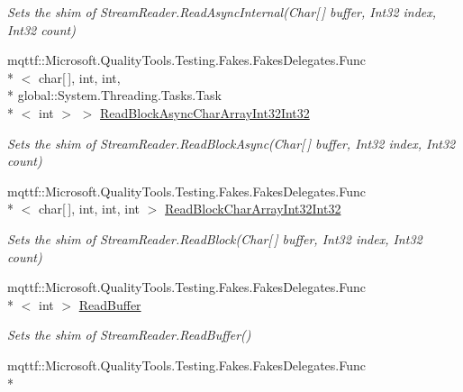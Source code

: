 \begin{DoxyCompactItemize}
\begin{DoxyCompactList}\small\item\em Sets the shim of Stream\-Reader.\-Read\-Async\-Internal(\-Char\mbox{[}$\,$\mbox{]} buffer, Int32 index, Int32 count)\end{DoxyCompactList}\item 
mqttf\-::\-Microsoft.\-Quality\-Tools.\-Testing.\-Fakes.\-Fakes\-Delegates.\-Func\\*
$<$ char\mbox{[}$\,$\mbox{]}, int, int, \\*
global\-::\-System.\-Threading.\-Tasks.\-Task\\*
$<$ int $>$ $>$ \hyperlink{class_system_1_1_i_o_1_1_fakes_1_1_shim_stream_reader_a238e61258cbe225f53c4c9f9249385ad}{Read\-Block\-Async\-Char\-Array\-Int32\-Int32}
\begin{DoxyCompactList}\small\item\em Sets the shim of Stream\-Reader.\-Read\-Block\-Async(\-Char\mbox{[}$\,$\mbox{]} buffer, Int32 index, Int32 count)\end{DoxyCompactList}\item 
mqttf\-::\-Microsoft.\-Quality\-Tools.\-Testing.\-Fakes.\-Fakes\-Delegates.\-Func\\*
$<$ char\mbox{[}$\,$\mbox{]}, int, int, int $>$ \hyperlink{class_system_1_1_i_o_1_1_fakes_1_1_shim_stream_reader_af3d6c970b696de454a6cd7bd5949cff2}{Read\-Block\-Char\-Array\-Int32\-Int32}
\begin{DoxyCompactList}\small\item\em Sets the shim of Stream\-Reader.\-Read\-Block(\-Char\mbox{[}$\,$\mbox{]} buffer, Int32 index, Int32 count)\end{DoxyCompactList}\item 
mqttf\-::\-Microsoft.\-Quality\-Tools.\-Testing.\-Fakes.\-Fakes\-Delegates.\-Func\\*
$<$ int $>$ \hyperlink{class_system_1_1_i_o_1_1_fakes_1_1_shim_stream_reader_a104dad17f6074045365ed015a79d271d}{Read\-Buffer}
\begin{DoxyCompactList}\small\item\em Sets the shim of Stream\-Reader.\-Read\-Buffer()\end{DoxyCompactList}\item 
mqttf\-::\-Microsoft.\-Quality\-Tools.\-Testing.\-Fakes.\-Fakes\-Delegates.\-Func\\*

\end{DoxyCompactItemize}
